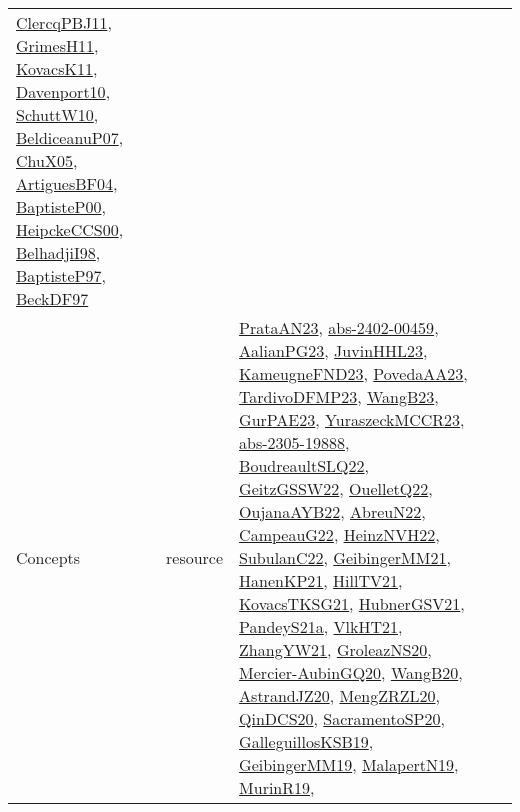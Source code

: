 {\begin{longtable}{llp{6cm}p{6cm}p{6cm}}
\href{papers/ClercqPBJ11.pdf}{ClercqPBJ11}\cite{ClercqPBJ11}, \href{papers/GrimesH11.pdf}{GrimesH11}\cite{GrimesH11}, \href{articles/KovacsK11.pdf}{KovacsK11}\cite{KovacsK11}, \href{papers/Davenport10.pdf}{Davenport10}\cite{Davenport10}, \href{papers/SchuttW10.pdf}{SchuttW10}\cite{SchuttW10}, \href{papers/BeldiceanuP07.pdf}{BeldiceanuP07}\cite{BeldiceanuP07}, \href{papers/ChuX05.pdf}{ChuX05}\cite{ChuX05}, \href{papers/ArtiguesBF04.pdf}{ArtiguesBF04}\cite{ArtiguesBF04}, \href{articles/BaptisteP00.pdf}{BaptisteP00}\cite{BaptisteP00}, \href{articles/HeipckeCCS00.pdf}{HeipckeCCS00}\cite{HeipckeCCS00}, \href{articles/BelhadjiI98.pdf}{BelhadjiI98}\cite{BelhadjiI98}, \href{papers/BaptisteP97.pdf}{BaptisteP97}\cite{BaptisteP97}, \href{papers/BeckDF97.pdf}{BeckDF97}\cite{BeckDF97}\\
Concepts & resource & \href{articles/PrataAN23.pdf}{PrataAN23}\cite{PrataAN23}, \href{articles/abs-2402-00459.pdf}{abs-2402-00459}\cite{abs-2402-00459}, \href{papers/AalianPG23.pdf}{AalianPG23}\cite{AalianPG23}, \href{papers/JuvinHHL23.pdf}{JuvinHHL23}\cite{JuvinHHL23}, \href{papers/KameugneFND23.pdf}{KameugneFND23}\cite{KameugneFND23}, \href{papers/PovedaAA23.pdf}{PovedaAA23}\cite{PovedaAA23}, \href{papers/TardivoDFMP23.pdf}{TardivoDFMP23}\cite{TardivoDFMP23}, \href{papers/WangB23.pdf}{WangB23}\cite{WangB23}, \href{articles/GurPAE23.pdf}{GurPAE23}\cite{GurPAE23}, \href{articles/YuraszeckMCCR23.pdf}{YuraszeckMCCR23}\cite{YuraszeckMCCR23}, \href{articles/abs-2305-19888.pdf}{abs-2305-19888}\cite{abs-2305-19888}, \href{papers/BoudreaultSLQ22.pdf}{BoudreaultSLQ22}\cite{BoudreaultSLQ22}, \href{papers/GeitzGSSW22.pdf}{GeitzGSSW22}\cite{GeitzGSSW22}, \href{papers/OuelletQ22.pdf}{OuelletQ22}\cite{OuelletQ22}, \href{papers/OujanaAYB22.pdf}{OujanaAYB22}\cite{OujanaAYB22}, \href{articles/AbreuN22.pdf}{AbreuN22}\cite{AbreuN22}, \href{articles/CampeauG22.pdf}{CampeauG22}\cite{CampeauG22}, \href{articles/HeinzNVH22.pdf}{HeinzNVH22}\cite{HeinzNVH22}, \href{articles/SubulanC22.pdf}{SubulanC22}\cite{SubulanC22}, \href{papers/GeibingerMM21.pdf}{GeibingerMM21}\cite{GeibingerMM21}, \href{papers/HanenKP21.pdf}{HanenKP21}\cite{HanenKP21}, \href{papers/HillTV21.pdf}{HillTV21}\cite{HillTV21}, \href{papers/KovacsTKSG21.pdf}{KovacsTKSG21}\cite{KovacsTKSG21}, \href{articles/HubnerGSV21.pdf}{HubnerGSV21}\cite{HubnerGSV21}, \href{articles/PandeyS21a.pdf}{PandeyS21a}\cite{PandeyS21a}, \href{articles/VlkHT21.pdf}{VlkHT21}\cite{VlkHT21}, \href{articles/ZhangYW21.pdf}{ZhangYW21}\cite{ZhangYW21}, \href{papers/GroleazNS20.pdf}{GroleazNS20}\cite{GroleazNS20}, \href{papers/Mercier-AubinGQ20.pdf}{Mercier-AubinGQ20}\cite{Mercier-AubinGQ20}, \href{papers/WangB20.pdf}{WangB20}\cite{WangB20}, \href{articles/AstrandJZ20.pdf}{AstrandJZ20}\cite{AstrandJZ20}, \href{articles/MengZRZL20.pdf}{MengZRZL20}\cite{MengZRZL20}, \href{articles/QinDCS20.pdf}{QinDCS20}\cite{QinDCS20}, \href{articles/SacramentoSP20.pdf}{SacramentoSP20}\cite{SacramentoSP20}, \href{papers/GalleguillosKSB19.pdf}{GalleguillosKSB19}\cite{GalleguillosKSB19}, \href{papers/GeibingerMM19.pdf}{GeibingerMM19}\cite{GeibingerMM19}, \href{papers/MalapertN19.pdf}{MalapertN19}\cite{MalapertN19}, \href{papers/MurinR19.pdf}{MurinR19}\cite{MurinR19}, 
\end{longtable}}
